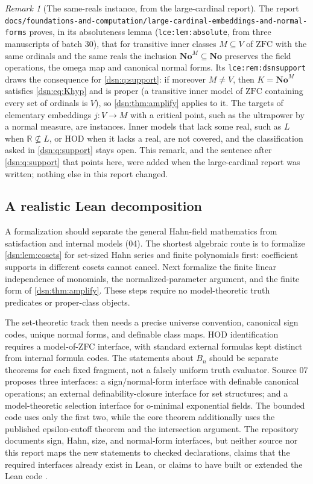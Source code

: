 \documentclass[11pt,a4paper]{article}
\numberwithin{equation}{section}
\theoremstyle{definition}
\theoremstyle{remark}
\newtheorem{remark}[remark]{Remark}
\newcommand{\No}{\mathbf{No}}
\newcommand{\HOD}{\mathrm{HOD}}
\newcommand{\ZFC}{\mathrm{ZFC}}
\newcommand{\R}{\mathbb R}
\newcommand{\lbl}[1]{\nolinkurl{#1}}
\newcommand{\fn}[1]{\nolinkurl{#1}}
\begin{document}
\begin{remark}[The same-reals instance, from the large-cardinal report]
\label{dsn:rem:largecardinal}
The report
\fn{docs/foundations-and-computation/large-cardinal-embeddings-and-normal-forms}
proves, in its absoluteness lemma (\lbl{lce:lem:absolute}, from three
manuscripts of batch 30), that for transitive inner classes $M\subseteq V$ of
$\ZFC$ with the same ordinals and the same reals the inclusion
$\No^M\subseteq\No$ preserves the field operations, the omega map and
canonical normal forms. Its \lbl{lce:rem:dsnsupport} draws the consequence
for \cref{dsn:q:support}: if moreover $M\ne V$, then $K=\No^M$ satisfies
\eqref{dsn:eq:Khyp} and is proper (a transitive inner model of $\ZFC$
containing every set of ordinals is $V$), so
\cref{dsn:thm:amplify} applies to it. The targets of elementary embeddings
$j:V\to M$ with a critical point, such as the ultrapower by a normal
measure, are instances. Inner models that lack some real, such as $L$ when
$\R\not\subseteq L$, or $\HOD$ when it lacks a real, are not covered, and the
classification asked in \cref{dsn:q:support} stays open. This remark, and
the sentence after \cref{dsn:q:support} that points here, were added when
the large-cardinal report was written; nothing else in this report changed.
\end{remark}

\subsection{A realistic Lean decomposition}

A formalization should separate the general Hahn-field mathematics
from satisfaction and internal models (04). The shortest algebraic route
is to formalize \cref{dsn:lem:cosets} for set-sized Hahn series and
finite polynomials first: coefficient supports in different cosets
cannot cancel. Next formalize the finite linear independence of
monomials, the normalized-parameter argument, and the finite form
of \cref{dsn:thm:amplify}. These steps require no model-theoretic
truth predicates or proper-class objects.

The set-theoretic track then needs a precise universe convention,
canonical sign codes, unique normal forms, and definable class maps.
$\HOD$ identification requires a model-of-ZFC interface, with standard
external formulas kept distinct from internal formula codes.
The statements about $B_n$ should be separate theorems for each
fixed fragment, not a falsely uniform truth evaluator. Source 07 proposes
three interfaces: a sign/normal-form interface with definable canonical
operations; an external definability-closure interface for set structures;
and a model-theoretic selection interface for o-minimal exponential fields.
The bounded code uses only the first two, while the core theorem
additionally uses the published epsilon-cutoff theorem and the intersection
argument. The repository documents sign, Hahn, size, and normal-form
interfaces, but neither source nor this report maps the new statements to
checked declarations, claims that the required interfaces already exist in
Lean, or claims to have built or extended the Lean code \cite{Repo}.
\end{document}
